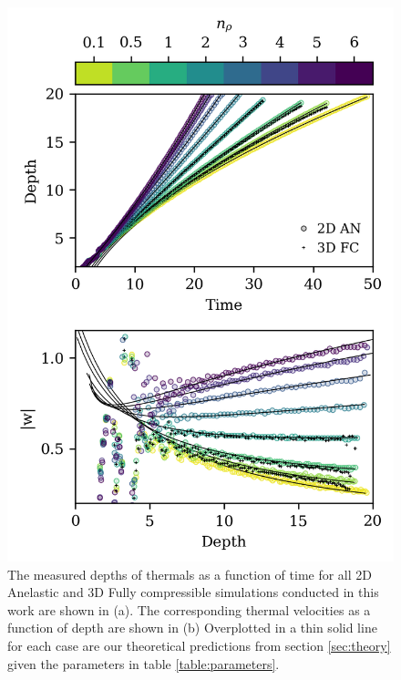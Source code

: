 \documentclass[twocolumn, amsmath, amsfonts, amssymb, trackchanges]{aastex62}
\begin{document}
\begin{figure}[t!]
    \includegraphics[width=\columnwidth]{results_panels.png}
    \caption{
	The measured depths of thermals as a function of time for all 2D Anelastic and 3D Fully compressible simulations conducted in this work are shown in (a).
	The corresponding thermal velocities as a function of depth are shown in (b)
	Overplotted in a thin solid line for each case are our theoretical predictions from section \ref{sec:theory} given the parameters in table \ref{table:parameters}.
    \label{fig:results_panels} }
\end{figure}
\end{document}
